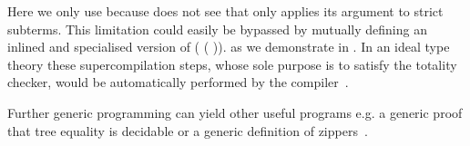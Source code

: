 Here we only use \assertTotal{} because \idris{} does not see that
 only applies its argument to strict subterms.
This limitation could easily be bypassed by mutually defining
an inlined and specialised version of
( \IdrisKeyword{\KatlaUnderscore} ( )).
as we demonstrate in .
%
In an ideal type theory these supercompilation steps, whose sole
purpose is to satisfy the totality checker, would be automatically
performed by the compiler~\citep{MANUAL:phd/dublin/Mendel12}.


Further generic programming can yield other useful programs e.g. a
generic proof that tree equality is decidable or a generic definition
of zippers~\citep{DBLP:conf/icfp/LohM11}.

